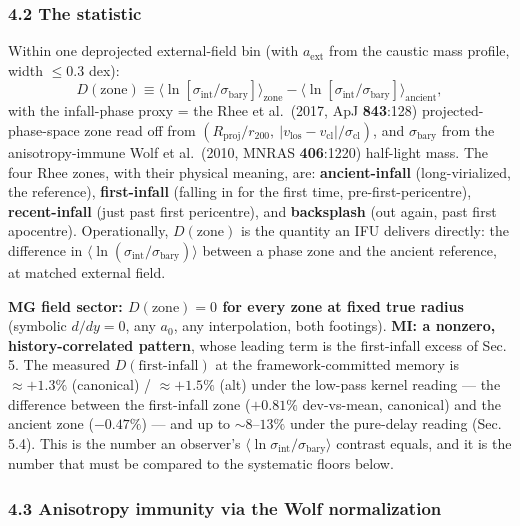 \documentclass[
]{article}
\begin{document}
\subsubsection{4.2 The statistic}\label{the-statistic}

Within one deprojected external-field bin (with \(a_\mathrm{ext}\) from the
caustic mass profile, width \(\le0.3\) dex): \[
D(\text{zone})\equiv\big\langle\ln[\sigma_\mathrm{int}/\sigma_\mathrm{bary}]\big\rangle_\mathrm{zone}-\big\langle\ln[\sigma_\mathrm{int}/\sigma_\mathrm{bary}]\big\rangle_\mathrm{ancient},
\] with the infall-phase proxy = the Rhee et al.~(2017, ApJ
\textbf{843}:128) projected-phase-space zone read off from
\((R_\mathrm{proj}/r_{200},\ |v_\mathrm{los}-v_\mathrm{cl}|/\sigma_\mathrm{cl})\),
and \(\sigma_\mathrm{bary}\) from the anisotropy-immune Wolf et al.~(2010,
MNRAS \textbf{406}:1220) half-light mass. The four Rhee zones, with
their physical meaning, are: \textbf{ancient-infall} (long-virialized,
the reference), \textbf{first-infall} (falling in for the first time,
pre-first-pericentre), \textbf{recent-infall} (just past first
pericentre), and \textbf{backsplash} (out again, past first apocentre).
Operationally, \(D(\text{zone})\) is the quantity an IFU delivers
directly: the difference in
\(\langle\ln(\sigma_\mathrm{int}/\sigma_\mathrm{bary})\rangle\) between a
phase zone and the ancient reference, at matched external field.

\textbf{MG field sector: \(D(\text{zone})=0\) for every zone at fixed
true radius} (symbolic \(d/dy=0\), any \(a_0\), any interpolation, both
footings). \textbf{MI: a nonzero, history-correlated pattern}, whose
leading term is the first-infall excess of Sec. 5. The measured
\(D(\text{first-infall})\) at the framework-committed memory is
\(\approx+1.3\%\) (canonical) / \(\approx+1.5\%\) (alt) under the
low-pass kernel reading --- the difference between the first-infall zone
(\(+0.81\%\) dev-vs-mean, canonical) and the ancient zone (\(-0.47\%\))
--- and up to \(\sim8\)--\(13\%\) under the pure-delay reading (Sec.
5.4). This is the number an observer's
\(\langle\ln\sigma_\mathrm{int}/\sigma_\mathrm{bary}\rangle\) contrast equals,
and it is the number that must be compared to the systematic floors
below.

\subsubsection{4.3 Anisotropy immunity via the Wolf
normalization}\label{anisotropy-immunity-via-the-wolf-normalization}
\end{document}
